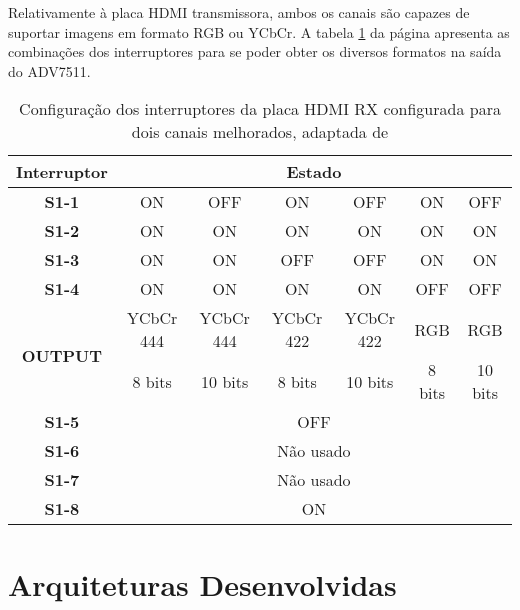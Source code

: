 Relativamente à placa HDMI transmissora, ambos os canais são capazes de suportar imagens em formato RGB ou YCbCr. A tabela \ref{table:HDMI_2ch_melhoradp_TX} da página \pageref{table:HDMI_2ch_melhoradp_TX} apresenta as combinações dos interruptores para se poder obter os diversos formatos na saída do ADV7511.
\begin{table}[h!]
	\centering
	\begin{tabular}{|c|c|c|c|c|c|c|}
		\hline
		\textbf{Interruptor}             & \multicolumn{6}{c|}{\textbf{Estado}}                             \\ \hline
		\textbf{S1-1}                    & ON        & OFF       & ON        & OFF       & ON     & OFF     \\ \hline
		\textbf{S1-2}                    & ON        & ON        & ON        & ON        & ON     & ON      \\ \hline
		\textbf{S1-3}                    & ON        & ON        & OFF       & OFF       & ON     & ON      \\ \hline
		\textbf{S1-4}                    & ON        & ON        & ON        & ON        & OFF    & OFF     \\ \hline
		\multirow{2}{*}{\textbf{OUTPUT}} & YCbCr 444 & YCbCr 444 & YCbCr 422 & YCbCr 422 & RGB    & RGB     \\ \cline{2-7} 
		& 8 bits    & 10 bits   & 8 bits    & 10 bits   & 8 bits & 10 bits \\ \hline
		\textbf{S1-5}                    & \multicolumn{6}{c|}{OFF}                                         \\ \hline
		\textbf{S1-6}                    & \multicolumn{6}{c|}{Não usado}                                   \\ \hline
		\textbf{S1-7}                    & \multicolumn{6}{c|}{Não usado}                                   \\ \hline
		\textbf{S1-8}                    & \multicolumn{6}{c|}{ON}                                          \\ \hline
	\end{tabular}
	\caption{Configuração dos interruptores da placa HDMI RX configurada para dois canais melhorados, adaptada de \cite{R013}}
	\label{table:HDMI_2ch_melhoradp_TX} 
\end{table}
\section{Arquiteturas Desenvolvidas} \label{sec:HDMIarquiteturas}

